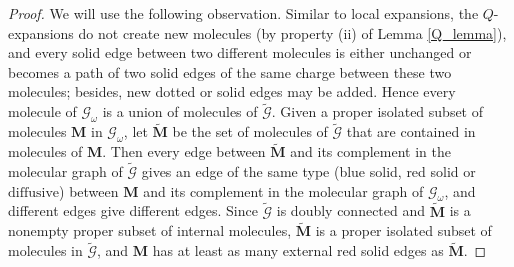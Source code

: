 \documentclass{article}
\newcommand{\1}{\mathds{1}}
\numberwithin{equation}{section}
\renewcommand{\cal}{\mathcal}
\newcommand{\wt}{\widetilde}
\newcommand{\dashed}{\text{diffusive}}
\theoremstyle{plain} %
\theoremstyle{remark}
\newcommand{\cob}{\color{purple}}
\newcommand{\Pol}{{\mathbf{M}}}
\begin{document}
\begin{proof}


We will use the following observation. Similar to local expansions, the $Q$-expansions do not create new molecules (by property (ii) of Lemma \ref{Q_lemma}), and every solid edge between two different molecules is either unchanged or becomes a path of two solid edges of the same charge between these two molecules; besides, new dotted or solid edges may be added. Hence every molecule of $\cal G_\omega$ is a union of molecules of $\wt{\cal G}$. Given a proper isolated subset of molecules $\Pol$ in $\cal G_\omega$, let $\wt\Pol$ be the set of molecules of $\wt{\cal G}$ that are contained in molecules of $\Pol$. Then every edge between $\wt\Pol$ and its complement in the molecular graph of $\wt{\cal G}$ gives an edge of the same type (blue solid, red solid or $\dashed$) between $\Pol$ and its complement in the molecular graph of $\cal G_\omega$, and different edges give different edges. Since $\wt{\cal G}$ is doubly connected and $\wt\Pol$ is a nonempty proper subset of internal molecules, $\wt\Pol$ is a proper isolated subset of molecules in $\wt{\cal G}$, and $\Pol$ has at least as many external red solid edges as $\wt\Pol$. 


\end{proof}
\end{document}
